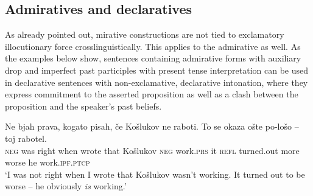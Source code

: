 \documentclass[output=paper]{langscibook}
\begin{document}

\subsection{Admiratives and declaratives}\label{sec:decl}

As already pointed out, mirative constructions are not tied to exclamatory illocutionary force crosslinguistically. This applies to the  admirative as well. As the examples below show, sentences containing admirative forms with auxiliary drop and imperfect past participles with present tense interpretation can be used in declarative sentences with non-exclamative, declarative intonation, where they express commitment to the asserted proposition as well as a clash between the proposition and the speaker's past beliefs.

\ea \label{ex:koslukov}
\gll Ne bjah prava, kogato pisah, če Košlukov ne raboti. %
To se okaza ošte po-lošo -- toj rabotel. \\
\textsc{neg} was right when wrote that Košlukov \textsc{neg} work.\textsc{prs}
 it \textsc{refl} turned.out more worse {} he work.\textsc{ipf.ptcp}\\
\glt `I was not right when I wrote that Košlukov wasn't working. It turned out to be worse -- he obviously \emph{is} working.'
\z
\end{document}
